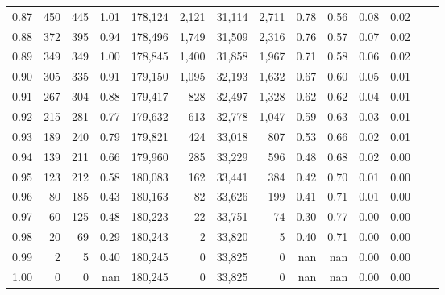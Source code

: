 \begin{tabular}{rrrrrrrrrrrrrr}
0.87 &    450 &  445 &    1.01 &  178,124 &    2,121 &  31,114 &   2,711 &  0.78 &  0.56 &  0.08 &      0.02 \\
0.88 &    372 &  395 &    0.94 &  178,496 &    1,749 &  31,509 &   2,316 &  0.76 &  0.57 &  0.07 &      0.02 \\
0.89 &    349 &  349 &    1.00 &  178,845 &    1,400 &  31,858 &   1,967 &  0.71 &  0.58 &  0.06 &      0.02 \\
0.90 &    305 &  335 &    0.91 &  179,150 &    1,095 &  32,193 &   1,632 &  0.67 &  0.60 &  0.05 &      0.01 \\
0.91 &    267 &  304 &    0.88 &  179,417 &      828 &  32,497 &   1,328 &  0.62 &  0.62 &  0.04 &      0.01 \\
0.92 &    215 &  281 &    0.77 &  179,632 &      613 &  32,778 &   1,047 &  0.59 &  0.63 &  0.03 &      0.01 \\
0.93 &    189 &  240 &    0.79 &  179,821 &      424 &  33,018 &     807 &  0.53 &  0.66 &  0.02 &      0.01 \\
0.94 &    139 &  211 &    0.66 &  179,960 &      285 &  33,229 &     596 &  0.48 &  0.68 &  0.02 &      0.00 \\
0.95 &    123 &  212 &    0.58 &  180,083 &      162 &  33,441 &     384 &  0.42 &  0.70 &  0.01 &      0.00 \\
0.96 &     80 &  185 &    0.43 &  180,163 &       82 &  33,626 &     199 &  0.41 &  0.71 &  0.01 &      0.00 \\
0.97 &     60 &  125 &    0.48 &  180,223 &       22 &  33,751 &      74 &  0.30 &  0.77 &  0.00 &      0.00 \\
0.98 &     20 &   69 &    0.29 &  180,243 &        2 &  33,820 &       5 &  0.40 &  0.71 &  0.00 &      0.00 \\
0.99 &      2 &    5 &    0.40 &  180,245 &        0 &  33,825 &       0 &   nan &   nan &  0.00 &      0.00 \\
1.00 &      0 &    0 &     nan &  180,245 &        0 &  33,825 &       0 &   nan &   nan &  0.00 &      0.00 \\
\bottomrule
\end{tabular}
